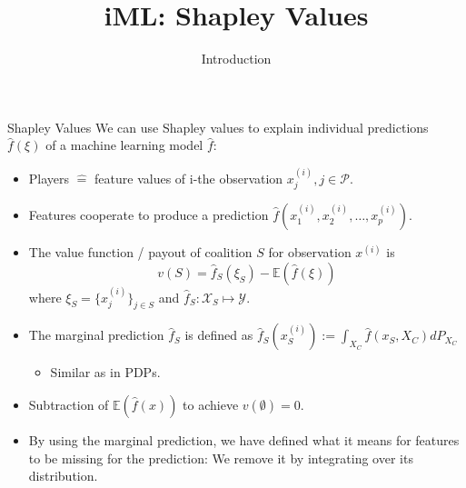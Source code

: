 \documentclass[aspectratio=169]{../latex_main/tntbeamer}  %
\title[Introduction]{iML: Shapley Values}
\subtitle{Introduction}
\begin{document}
	
	\maketitle
	

\begin{frame}{Shapley Values}
  We can use Shapley values to explain individual predictions $\hat{f}(\xi)$ of a machine learning model $\hat{f}$:
\begin{itemize}
  \item Players $\hat{=}$ feature values of i-the observation $x_j^{(i)}, j \in \mathcal{P}$.
  \item Features cooperate to produce a prediction $\hat{f}(x^{(i)}_1, x^{(i)}_2, \ldots, x^{(i)}_p)$.
  \item The value function / payout of coalition $S$ for observation $x^{(i)}$ is
    $$v(S) =  \hat{f}_{S} (\xi_S) - \mathbb{E} (\hat{f}(\xi))$$ 
    where $\xi_S = \{x_j^{(i)}\}_{j \in S}$ and $\hat{f}_S: \mathcal{X}_S \mapsto \mathcal{Y}$.
\item The marginal prediction $\hat{f}_S$ is defined as $\hat{f}_{S}(x_S^{(i)}) := \int_{X_C} \hat{f}(x_S, X_C)d P_{X_C}$
\begin{itemize}
    \item Similar as in PDPs.
\end{itemize}

\item Subtraction of $\mathbb{E}(\hat{f}(x))$ to achieve $v(\emptyset) = 0$.
\item By using the marginal prediction, we have defined what it means for features to be \alert{missing} for the prediction: We remove it by integrating over its distribution.
\end{itemize}

\end{frame}
\end{document}
